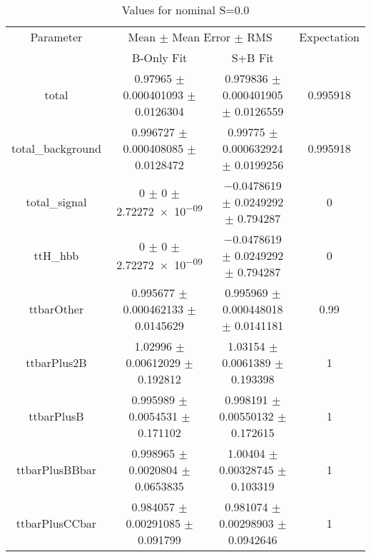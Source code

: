 \begin{table}
\centering
\caption{Values for nominal S=0.0}
\begin{tabular}{cccc}
\toprule
Parameter & \multicolumn{2}{c}{Mean $\pm$ Mean Error $\pm$ RMS} & Expectation\\
 & B-Only Fit & S+B Fit & \\
\midrule
total & \num{0.97965} $\pm$ \num{0.000401093} $\pm$ \num{0.0126304} & \num{0.979836} $\pm$ \num{0.000401905} $\pm$ \num{0.0126559} & \num{0.995918}\\
total\_background & \num{0.996727} $\pm$ \num{0.000408085} $\pm$ \num{0.0128472} & \num{0.99775} $\pm$ \num{0.000632924} $\pm$ \num{0.0199256} & \num{0.995918}\\
total\_signal & \num{0} $\pm$ \num{0} $\pm$ \num{2.72272e-09} & \num{-0.0478619} $\pm$ \num{0.0249292} $\pm$ \num{0.794287} & \num{0}\\
ttH\_hbb & \num{0} $\pm$ \num{0} $\pm$ \num{2.72272e-09} & \num{-0.0478619} $\pm$ \num{0.0249292} $\pm$ \num{0.794287} & \num{0}\\
ttbarOther & \num{0.995677} $\pm$ \num{0.000462133} $\pm$ \num{0.0145629} & \num{0.995969} $\pm$ \num{0.000448018} $\pm$ \num{0.0141181} & \num{0.99}\\
ttbarPlus2B & \num{1.02996} $\pm$ \num{0.00612029} $\pm$ \num{0.192812} & \num{1.03154} $\pm$ \num{0.0061389} $\pm$ \num{0.193398} & \num{1}\\
ttbarPlusB & \num{0.995989} $\pm$ \num{0.0054531} $\pm$ \num{0.171102} & \num{0.998191} $\pm$ \num{0.00550132} $\pm$ \num{0.172615} & \num{1}\\
ttbarPlusBBbar & \num{0.998965} $\pm$ \num{0.0020804} $\pm$ \num{0.0653835} & \num{1.00404} $\pm$ \num{0.00328745} $\pm$ \num{0.103319} & \num{1}\\
ttbarPlusCCbar & \num{0.984057} $\pm$ \num{0.00291085} $\pm$ \num{0.091799} & \num{0.981074} $\pm$ \num{0.00298903} $\pm$ \num{0.0942646} & \num{1}\\
\bottomrule
\end{tabular}
\end{table}